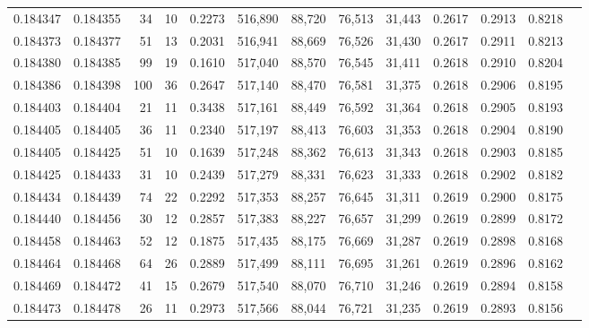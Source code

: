 \begin{tabular}{rrrrrrrrrrrrr}
0.184347 & 0.184355 &    34 &  10 &                                     0.2273 & 516,890 &  88,720 &  76,513 &  31,443 & 0.2617 & 0.2913 & 0.8218 \\
0.184373 & 0.184377 &    51 &  13 &                                     0.2031 & 516,941 &  88,669 &  76,526 &  31,430 & 0.2617 & 0.2911 & 0.8213 \\
0.184380 & 0.184385 &    99 &  19 &                                     0.1610 & 517,040 &  88,570 &  76,545 &  31,411 & 0.2618 & 0.2910 & 0.8204 \\
0.184386 & 0.184398 &   100 &  36 &                                     0.2647 & 517,140 &  88,470 &  76,581 &  31,375 & 0.2618 & 0.2906 & 0.8195 \\
0.184403 & 0.184404 &    21 &  11 &                                     0.3438 & 517,161 &  88,449 &  76,592 &  31,364 & 0.2618 & 0.2905 & 0.8193 \\
0.184405 & 0.184405 &    36 &  11 &                                     0.2340 & 517,197 &  88,413 &  76,603 &  31,353 & 0.2618 & 0.2904 & 0.8190 \\
0.184405 & 0.184425 &    51 &  10 &                                     0.1639 & 517,248 &  88,362 &  76,613 &  31,343 & 0.2618 & 0.2903 & 0.8185 \\
0.184425 & 0.184433 &    31 &  10 &                                     0.2439 & 517,279 &  88,331 &  76,623 &  31,333 & 0.2618 & 0.2902 & 0.8182 \\
0.184434 & 0.184439 &    74 &  22 &                                     0.2292 & 517,353 &  88,257 &  76,645 &  31,311 & 0.2619 & 0.2900 & 0.8175 \\
0.184440 & 0.184456 &    30 &  12 &                                     0.2857 & 517,383 &  88,227 &  76,657 &  31,299 & 0.2619 & 0.2899 & 0.8172 \\
0.184458 & 0.184463 &    52 &  12 &                                     0.1875 & 517,435 &  88,175 &  76,669 &  31,287 & 0.2619 & 0.2898 & 0.8168 \\
0.184464 & 0.184468 &    64 &  26 &                                     0.2889 & 517,499 &  88,111 &  76,695 &  31,261 & 0.2619 & 0.2896 & 0.8162 \\
0.184469 & 0.184472 &    41 &  15 &                                     0.2679 & 517,540 &  88,070 &  76,710 &  31,246 & 0.2619 & 0.2894 & 0.8158 \\
0.184473 & 0.184478 &    26 &  11 &                                     0.2973 & 517,566 &  88,044 &  76,721 &  31,235 & 0.2619 & 0.2893 & 0.8156 \\

\end{tabular}
